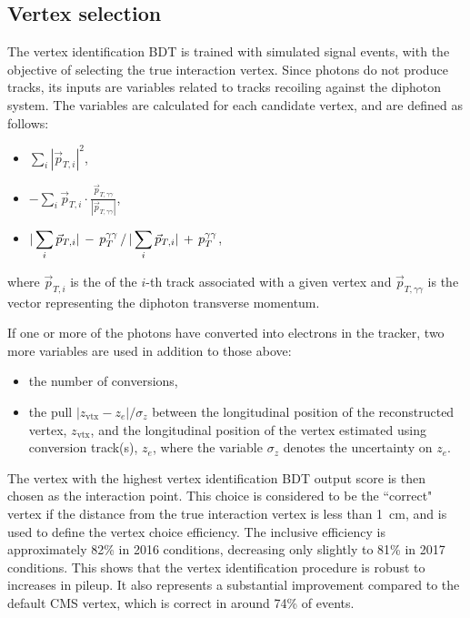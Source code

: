 \subsection{Vertex selection}

The vertex identification BDT is trained with simulated \Hgg signal events, 
with the objective of selecting the true interaction vertex.
Since photons do not produce tracks, its inputs are variables related to tracks
recoiling against the diphoton system.
The variables are calculated for each candidate vertex, and are defined as follows:
\begin{itemize}
        \item $\displaystyle \sum_{i}|\vec{p}_{T,i}|^{2}$,
        \item $\displaystyle -\sum_{i} \vec{p}_{T,i}\cdot \frac{\vec{p}_{T,\gamma\gamma}}{|\vec{p}_{T,\gamma\gamma}|} $,
        \item $\displaystyle |\sum_{i}\vec{p}_{T,i}|\,-\,p_T^{\gamma\gamma}\,/\,|\sum_{i}\vec{p}_{T,i}|\,+\,p_T^{\gamma\gamma}$,
\end{itemize}
where $\vec{p}_{T,i}$ is the \pt of the $i$-th track
associated with a given vertex 
and $\vec{p}_{T,\gamma\gamma}$ is the vector representing the diphoton transverse momentum.

If one or more of the photons have converted into electrons in the tracker, 
two more variables are used in addition to those above:
\begin{itemize}
        \item the number of conversions,
        \item the pull $|z_{\text{vtx}} - z_e| /\sigma_{z}$ between the
                longitudinal position of the reconstructed vertex,
                $z_{\text{vtx}}$, and the longitudinal position of the
                vertex estimated using conversion track(s), $z_e$,
                where the variable $\sigma_{z}$ denotes the uncertainty 
                on $z_e$.
\end{itemize}

The vertex with the highest vertex identification BDT output score is then chosen 
as the \Hgg interaction point.
This choice is considered to be the ``correct" vertex if the distance from the true interaction vertex
is less than \SI{1}{cm}, and is used to define the vertex choice efficiency.
The inclusive efficiency is approximately 82\% in 2016 conditions, %
decreasing only slightly to 81\% in 2017 conditions.
This shows that the vertex identification procedure is robust to increases in pileup.
It also represents a substantial improvement compared to the default CMS vertex, %
which is correct in around 74\% of events.

